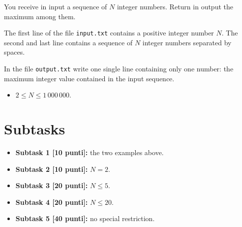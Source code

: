 \renewcommand{\nomebreve}{max\_seq}
\renewcommand{\titolo}{Find the maximum element in a sequence}

\introduzione{}

You receive in input a sequence of $N$ integer numbers.
Return in output the maximum among them.

The first line of the file \verb'input.txt'
contains a positive integer number $N$.
The second and last line
contains a sequence of $N$ integer numbers separated by spaces.

In the file \verb'output.txt' write one single line containing only one number: the maximum integer value contained in the input sequence.



\begin{itemize}[nolistsep, noitemsep]
  \item $2 \le N \le 1\,000\,000$.
\end{itemize}
  
  \section*{Subtasks}
  \begin{itemize}
    \item \textbf{Subtask 1 [10 punti]:} the two examples above.
    \item \textbf{Subtask 2 [10 punti]:} $N = 2$.
    \item \textbf{Subtask 3 [20 punti]:} $N \leq 5$.
    \item \textbf{Subtask 4 [20 punti]:} $N \leq 20$.
    \item \textbf{Subtask 5 [40 punti]:} no special restriction.
  \end{itemize}
  
